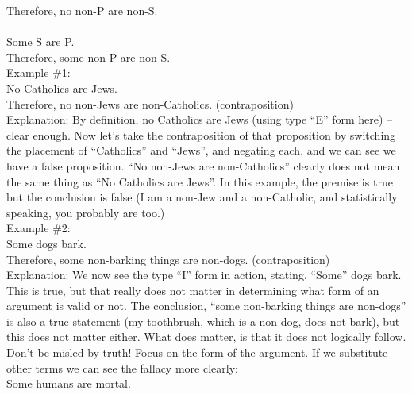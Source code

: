 \documentclass[a4paper,12pt,single,pdftex]{scrbook}
\begin{document}
    
      Therefore, no non-P are non-S.
    \\

    
       
    \\

    
      Some S are P.
    \\

    
      Therefore, some non-P are non-S.
    \\

    
      Example \#1:
    \\

    
      No Catholics are Jews.
    \\

    
      Therefore, no non-Jews are non-Catholics. (contraposition)
    \\

    
      Explanation: By definition, no Catholics are Jews (using type “E” form here) -- clear enough.  Now let’s take the contraposition of that proposition by switching the placement of “Catholics” and “Jews”, and negating each, and we can see we have a false proposition.  “No non-Jews are non-Catholics” clearly does not mean the same thing as “No Catholics are Jews”.  In this example, the premise is true but the conclusion is false (I am a non-Jew and a non-Catholic, and statistically speaking, you probably are too.)
    \\

    
      Example \#2:
    \\

    
      Some dogs bark.
    \\

    
      Therefore, some non-barking things are non-dogs. (contraposition)
    \\

    
      Explanation: We now see the type “I” form in action, stating, “Some” dogs bark.  This is true, but that really does not matter in determining what form of an argument is valid or not.  The conclusion, “some non-barking things are non-dogs” is also a true statement (my toothbrush, which is a non-dog, does not bark), but this does not matter either.  What does matter, is that it does not logically follow.  Don’t be misled by truth!  Focus on the form of the argument.  If we substitute other terms we can see the fallacy more clearly:
    \\

    
      Some humans are mortal.
    \\
\end{document}

